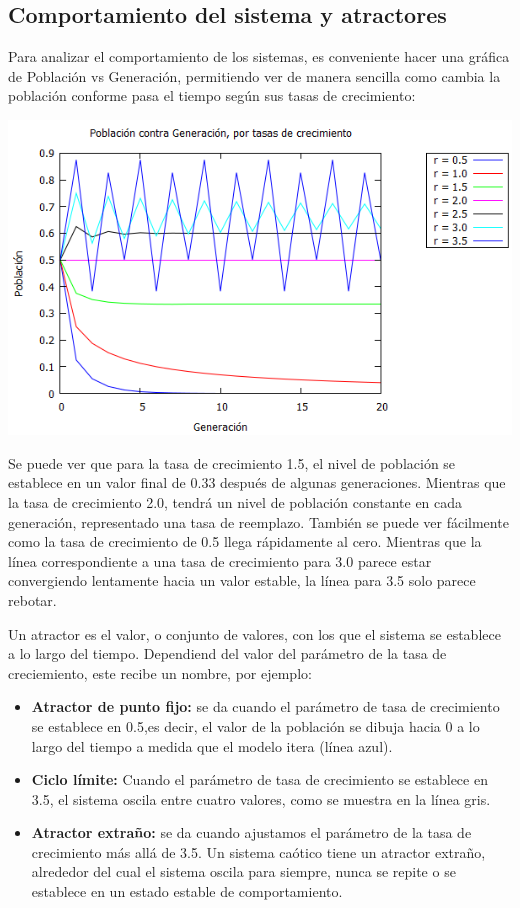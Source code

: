 \documentclass{article}
\begin{document}
\subsection{Comportamiento del sistema y atractores}

Para analizar el comportamiento de los sistemas, es conveniente hacer una gráfica de  Población vs Generación, permitiendo ver de manera sencilla como cambia la población conforme pasa el tiempo según sus tasas de crecimiento:

\begin{center}
\includegraphics[width=.8\textwidth]{Imagen1.PNG}
\end{center}

Se puede ver que para la tasa de crecimiento 1.5,  el nivel de población se establece en un valor final de 0.33 después de algunas generaciones. Mientras que la tasa de crecimiento 2.0, tendrá un nivel de población constante en cada generación, representado una tasa de reemplazo. También se puede ver fácilmente como la tasa de crecimiento de 0.5 llega rápidamente al cero. Mientras que la línea correspondiente a una tasa de crecimiento para 3.0 parece estar convergiendo lentamente hacia un valor estable, la línea para 3.5 solo parece rebotar.


Un atractor es el valor, o conjunto de valores, con los que el sistema se establece a lo largo del tiempo. Dependiend del valor del parámetro de la tasa de creciemiento, este recibe un nombre, por ejemplo:

\begin{itemize}
\item \textbf{Atractor de punto fijo:} se da cuando el parámetro de tasa de crecimiento se establece en 0.5,es decir, el valor de la población se dibuja hacia 0 a lo largo del tiempo a medida que el modelo itera (línea azul).
\item \textbf{Ciclo límite:} Cuando el parámetro de tasa de crecimiento se establece en 3.5, el sistema oscila entre cuatro valores, como se muestra en la línea gris.
\item \textbf{Atractor extraño:} se da cuando ajustamos el parámetro de la tasa de crecimiento más allá de 3.5. Un sistema caótico tiene un atractor extraño, alrededor del cual el sistema oscila para siempre, nunca se repite o se establece en un estado estable de comportamiento. 
\end{itemize}
\end{document}
